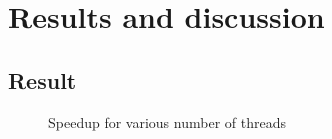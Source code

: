 \chapter{Results and discussion}

\section{Result}

\begin{figure}[H]
  \begin{center}
  \end{center}
  \caption{Speedup for various number of threads}
  \label{fig:speedup}
\end{figure}
